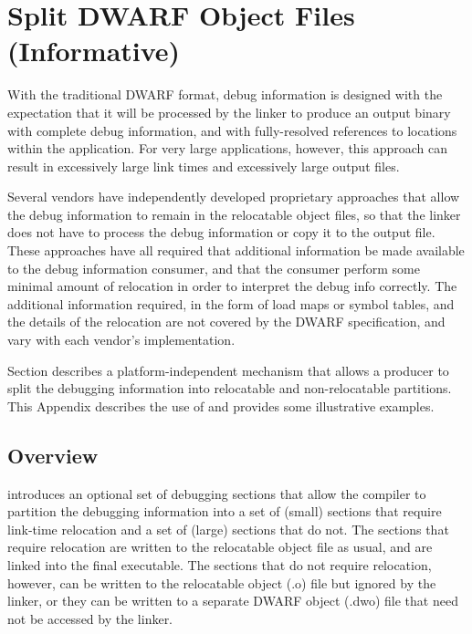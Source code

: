 \chapter[Split DWARF Object Files (Informative)]{Split DWARF Object Files (Informative)}
\label{app:splitdwarfobjectsinformative}
With the traditional DWARF format, debug information is designed
with the expectation that it will be processed by the linker to
produce an output binary with complete debug information, and
with fully-resolved references to locations within the
application. For very large applications, however, this approach
can result in excessively large link times and excessively large
output files. 

Several vendors have independently developed
proprietary approaches that allow the debug information to remain
in the relocatable object files, so that the linker does not have
to process the debug information or copy it to the output file.
These approaches have all required that additional information be
made available to the debug information consumer, and that the
consumer perform some minimal amount of relocation in order to
interpret the debug info correctly. The additional information
required, in the form of load maps or symbol tables, and the
details of the relocation are not covered by the DWARF
specification, and vary with each vendor's implementation.

Section  describes a
platform-independent mechanism that allows a producer to
split the debugging information into relocatable and
non-relocatable partitions. This Appendix describes the use
of  and provides some illustrative
examples.

\section{Overview}
\label{app:splitoverview}
\DWARFVersionV{} introduces an optional set of debugging sections
that allow the compiler to partition the debugging information
into a set of (small) sections that require link-time relocation
and a set of (large) sections that do not. The sections that
require relocation are written to the relocatable object file as
usual, and are linked into the final executable. The sections
that do not require relocation, however, can be written to the
relocatable object (.o) file but ignored by the linker, or they
can be written to a separate DWARF object (.dwo{}) 
 file
that need not be accessed by the linker.

